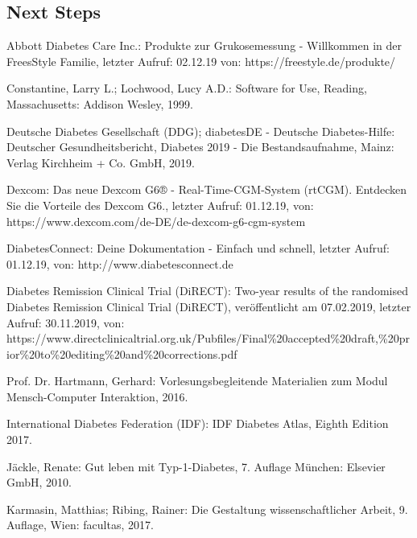 \documentclass[a4paper,11pt]{article}%
\renewcommand{\\}{\vspace*{0.5\baselineskip} \newline}
\begin{document}
\subsection{Next Steps}

\newpage

\begin{thebibliography}{1}
	
	Abbott Diabetes Care Inc.:
	Produkte zur Grukosemessung - Willkommen in der FreesStyle Familie, letzter Aufruf: 02.12.19 von:
	https://freestyle.de/produkte/	
	
	Constantine, Larry L.; Lochwood, Lucy A.D.: 
	Software for Use, 
	Reading, Massachusetts: Addison Wesley,
	1999.
	
	Deutsche Diabetes Gesellschaft (DDG); diabetesDE - Deutsche Diabetes-Hilfe:
	Deutscher Gesundheitsbericht, Diabetes 2019 - Die Bestandsaufnahme, 
	Mainz: Verlag Kirchheim + Co. GmbH,
	2019.
	
	Dexcom:
	Das neue Dexcom G6® - Real-Time-CGM-System (rtCGM). Entdecken Sie die Vorteile des Dexcom G6., letzter Aufruf: 01.12.19, von: https://www.dexcom.com/de-DE/de-dexcom-g6-cgm-system
	
	DiabetesConnect:
	Deine Dokumentation - Einfach und schnell, letzter Aufruf: 01.12.19, von: http://www.diabetesconnect.de
	
	Diabetes Remission Clinical Trial (DiRECT):
	Two-year results of the randomised Diabetes Remission Clinical Trial (DiRECT), veröffentlicht am 07.02.2019, \newline
	letzter Aufruf: 30.11.2019, von: https://www.directclinicaltrial.org.uk/Pubfiles/Final\newline\%20accepted\%20draft,\%20prior\%20to\%20editing\%20and\%20corrections.pdf
	
	Prof. Dr. Hartmann, Gerhard: 
	Vorlesungsbegleitende Materialien zum Modul Mensch-Computer Interaktion, 
	2016.
	
	International Diabetes Federation (IDF): 
	IDF Diabetes Atlas, Eighth Edition 2017.
	
	Jäckle, Renate: 
	Gut leben mit Typ-1-Diabetes, 7. Auflage
	München: Elsevier GmbH,
	2010.
	
	Karmasin, Matthias; Ribing, Rainer: 
	Die Gestaltung wissenschaftlicher Arbeit, 9. Auflage,
	Wien: facultas,
	2017.
	

\end{thebibliography}
\end{document}
